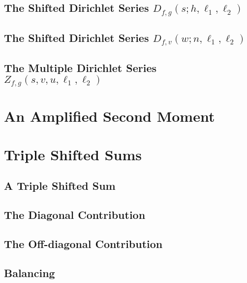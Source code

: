 \documentclass[11pt]{amsart}
\newcommand{\<}{\left\langle}
\renewcommand{\>}{\right\rangle}
\theoremstyle{remark}
\numberwithin{theorem}{section}
\numberwithin{equation}{section}
\begin{document}
  \subsection*{The Shifted Dirichlet Series \texorpdfstring{$D_{f,g}(s;h,\ell_{1},\ell_{2})$}{}}
  \subsection*{The Shifted Dirichlet Series \texorpdfstring{$D_{f,v}(w;n,\ell_{1},\ell_{2})$}{}}
  \subsection*{The Multiple Dirichlet Series \texorpdfstring{$Z_{f,g}(s,v,u,\ell_{1},\ell_{2})$}{}}
\section{An Amplified Second Moment}
\section{Triple Shifted Sums}
  \subsection*{A Triple Shifted Sum}
  \subsection*{The Diagonal Contribution}
  \subsection*{The Off-diagonal Contribution}
  \subsection*{Balancing}
\end{document}
